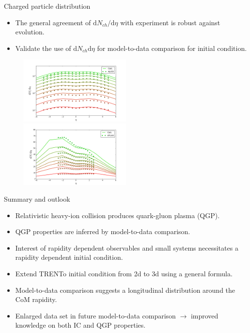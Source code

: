 \documentclass[11pt]{beamer}
\begin{document}
\begin{frame}{Charged particle distribution}
\begin{itemize}
\item The general agreement of $\mathrm{d}N_{ch}/\mathrm{d}\eta$ with experiment is robust against evolution.
\item Validate the use of $\mathrm{d}N_{ch}\mathrm{d}\eta$ for model-to-data comparison for initial condition.
\end{itemize}
\begin{figure}
\begin{center}
\includegraphics[width = 0.5\textwidth]{./pics/RUN-1-PbPb-dNdy-eta.png}
\includegraphics[width = 0.5\textwidth]{./pics/RUN-1-pPb-dNdy-eta.png}
\end{center}
\end{figure}
\end{frame}

\begin{frame}{Summary and outlook}
\begin{itemize}
\item Relativistic heavy-ion collision produces quark-gluon plasma (QGP).
\item QGP properties are inferred by model-to-data comparison.
\item Interest of rapidity dependent observables and small systems necessitates a rapidity dependent initial condition.
\item Extend TRENTo initial condition from 2d to 3d using a general formula.
\item Model-to-data comparison suggests a longitudinal distribution around the CoM rapidity.
\item Enlarged data set in future model-to-data comparison $\rightarrow$ improved knowledge on both IC and QGP properties.
\end{itemize}
\end{frame}
\end{document}
